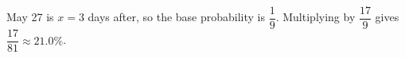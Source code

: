 May 27 is $x=3$ days after, so the base probability is $\dfrac19$. Multiplying by $\dfrac{17}9$ gives $\dfrac{17}{81}\approx\boxed{21.0\%}$.
